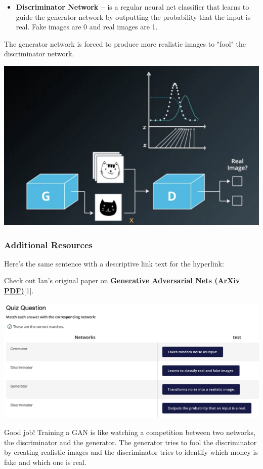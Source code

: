 \begin{itemize}
    \item \textbf{Discriminator Network –} is a regular neural net classifier that learns to guide the generator network by outputting the probability that the input is real. Fake images are 0 and real images are 1.
\end{itemize}

The generator network is forced to produce more realistic images to "fool" the discriminator network.

\includegraphics[width=0.5\linewidth]{img//genAdvNet/screen-shot-2022-06-30-at-7.07.48-pm.jpeg}

\subsubsection{Additional Resources}
Here's the same sentence with a descriptive link text for the hyperlink: \newline

Check out Ian's original paper on \href{https://arxiv.org/pdf/1406.2661.pdf}{\textbf{Generative Adversarial Nets (ArXiv PDF)}}[1].

\includegraphics[width=1\linewidth]{img//genAdvNet//gan/image.png}

Good job! Training a GAN is like watching a competition between two networks, the discriminator and the generator. The generator tries to fool the discriminator by creating realistic images and the discriminator tries to identify which money is fake and which one is real.

